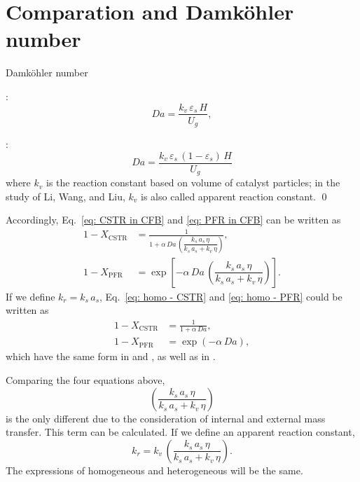 \section{Comparation and Damköhler number}
\begin{definition}
    Damköhler number

    \citet{jiang1991baffle, liujs2016}: 
    \begin{equation}
        Da = \frac{k_v\,\varepsilon_s\, H}{U_g}, 
    \end{equation}

    \citet{li2011catalytic, wang2015performance}: 
    \begin{equation}
        Da = \frac{k_v\,\varepsilon_s\,(1-\varepsilon_s) \, H}{U_g}
    \end{equation}
    where $k_v$ is the reaction constant based on volume of catalyst particles; 
    in the study of Li, Wang, and Liu, $k_v$ is also called apparent reaction constant.
    \qed
\end{definition}

Accordingly, Eq.~\eqref{eq: CSTR in CFB} and \eqref{eq: PFR in CFB} can be written as
\begin{align}
    1- X_\text{CSTR}
    &= \frac{1}{1+\alpha\,Da\,\left(
        \dfrac{k_s\,a_s\,\eta}{k_s\,a_s + k_v\,\eta}
        \right) },
    \\
    1- X_\text{PFR}
    &= \exp \left[
        -\alpha\, Da\,\left(
            \dfrac{k_s\,a_s\,\eta}{k_s\,a_s + k_v\,\eta}
            \right)
    \right].
\end{align}
If we define $k_r = k_s\,a_s$, Eq.~\eqref{eq: homo - CSTR} and \eqref{eq: homo - PFR} could be written as
\begin{align}
    1- X_\text{CSTR}
    &= \frac{1}{1+\alpha\,Da},
    \\
    1- X_\text{PFR}
    &= \exp (-\alpha\, Da),
\end{align}
which have the same form in \citet{li2011catalytic} and \citet{wang2015performance}, as well as in \citet{liujs2016}.

Comparing the four equations above, 
\begin{equation}
    \left(
    \dfrac{k_s\,a_s\,\eta}{k_s\,a_s + k_v\,\eta}
    \right)
    \label{eq: effection of i/d diffusion}
\end{equation}
is the only different due to the consideration of internal and external mass transfer. 
This term can be calculated. 
If we define an apparent reaction constant, 
\begin{equation}
    k_r = k_v\,
    \left(
    \dfrac{k_s\,a_s\,\eta}{k_s\,a_s + k_v\,\eta}
    \right). 
\end{equation}
The expressions of homogeneous and heterogeneous will be the same. 

